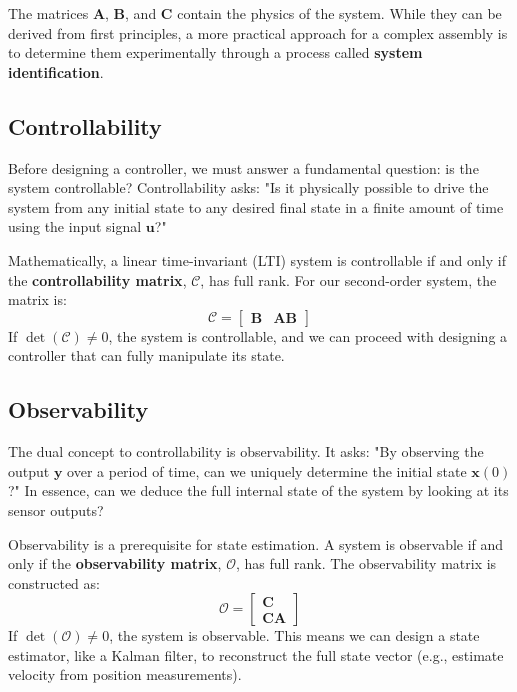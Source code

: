 \documentclass[12pt]{article}
\begin{document}
The matrices \(\mathbf{A}\), \(\mathbf{B}\), and \(\mathbf{C}\) contain the physics of the system. While they can be derived from first principles, a more practical approach for a complex assembly is to determine them experimentally through a process called \textbf{system identification}.

\subsection{Controllability}
Before designing a controller, we must answer a fundamental question: is the system controllable? Controllability asks: "Is it physically possible to drive the system from any initial state to any desired final state in a finite amount of time using the input signal \(\mathbf{u}\)?"

Mathematically, a linear time-invariant (LTI) system is controllable if and only if the \textbf{controllability matrix}, \(\mathcal{C}\), has full rank. For our second-order system, the matrix is:
\begin{equation}
    \mathcal{C} = \begin{bmatrix} \mathbf{B} & \mathbf{AB} \end{bmatrix}
\end{equation}
If \(\det(\mathcal{C}) \neq 0\), the system is controllable, and we can proceed with designing a controller that can fully manipulate its state.

\subsection{Observability}
The dual concept to controllability is observability. It asks: "By observing the output \(\mathbf{y}\) over a period of time, can we uniquely determine the initial state \(\mathbf{x}(0)\)?" In essence, can we deduce the full internal state of the system by looking at its sensor outputs?

Observability is a prerequisite for state estimation. A system is observable if and only if the \textbf{observability matrix}, \(\mathcal{O}\), has full rank. The observability matrix is constructed as:
\begin{equation}
    \mathcal{O} = \begin{bmatrix} \mathbf{C} \\ \mathbf{CA} \end{bmatrix}
\end{equation}
If \(\det(\mathcal{O}) \neq 0\), the system is observable. This means we can design a state estimator, like a Kalman filter, to reconstruct the full state vector (e.g., estimate velocity from position measurements).
\end{document}
